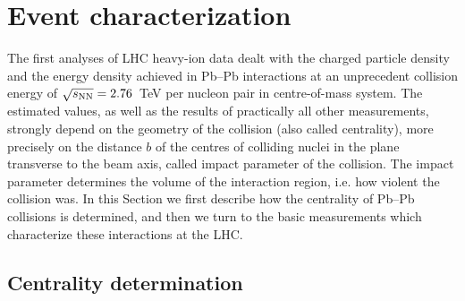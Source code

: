 \section{Event characterization}
\label{secks:eventchar}

The first analyses of LHC heavy-ion data dealt with the charged particle density and the energy density achieved in Pb--Pb interactions at an unprecedent collision energy of $\sqrt{s_{\rm NN}} = 2.76$~TeV per nucleon pair in centre-of-mass system. The estimated values, as well as the results of practically all other measurements, strongly depend on the geometry of the collision (also called centrality), more precisely on the distance $b$ of the centres of colliding nuclei in the plane transverse to the beam axis, called impact parameter of the collision. The impact parameter determines the volume of the interaction region, i.e. how violent the collision was.
In this Section we first describe how the centrality of Pb--Pb collisions is determined, and then we turn to the basic measurements which characterize these interactions at the LHC.



\subsection{Centrality determination}
\label{subsecks:centrality}


